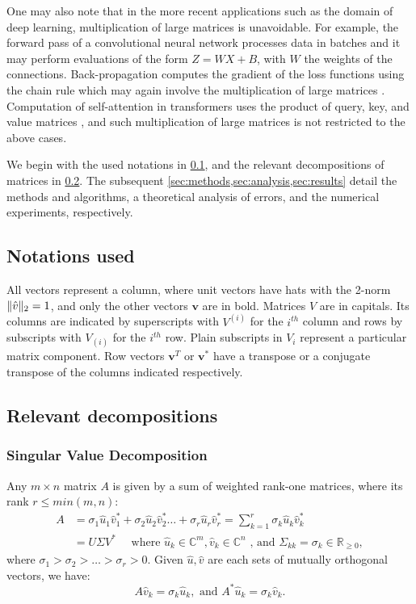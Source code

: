 \documentclass[onefignum,onetabnum]{siamart171218}
\DeclarePairedDelimiter\norm{\lVert}{\rVert}
\begin{document}
One may also note that in the more recent applications such as the domain of deep learning, multiplication of large matrices is unavoidable. For example, the forward pass of a convolutional neural network processes data in batches and it may perform evaluations of the form $Z = WX + B$, with $W$ the weights of the connections. Back-propagation computes the gradient of the loss functions using the chain rule which may again involve the multiplication of large matrices \cite{ciresan2011flexible,chellapilla2006high}. Computation of self-attention in transformers uses the product of query, key, and value matrices \cite{vaswani2017attention}, and such multiplication of large matrices is not restricted to the above cases.

We begin with the used notations in \cref{sec:notations}, and the relevant decompositions of matrices in \cref{sec:Decompositions}. The subsequent \cref{sec:methods,sec:analysis,sec:results} detail the methods and algorithms, a theoretical analysis of errors, and the numerical experiments, respectively.

\subsection{Notations used}\label{sec:notations}
All vectors represent a column, where unit vectors have hats with the 2-norm $\norm{\hat{v}}_2=1$, and only the other vectors $\bm v$ are in bold. Matrices $V$ are in capitals. Its columns are indicated by superscripts with $V^{(i)}$ for the $i^{th}$ column and rows by subscripts with $V_{(i)}$ for the $i^{th}$ row. Plain subscripts in $V_i$ represent a particular matrix component. Row vectors $\bm v^T$ or $\bm v^*$ have a transpose or a conjugate transpose of the columns indicated respectively.

\subsection{Relevant decompositions}\label{sec:Decompositions}

\subsubsection{Singular Value Decomposition}
Any $m \times n$ matrix $A$ is given by a sum of weighted rank-one matrices, where its rank $r \leq min(m,n)$:
\begin{align*}
    A &= \sigma_1 \hat{u}_1 \hat{v}_1^* + \sigma_2 \hat{u}_2 \hat{v}_2^* \dots + \sigma_{r} \hat{u}_{r} \hat{v}_{r}^* = \sum_{k = 1}^{r} \sigma_k \hat{u}_k \hat{v}_k^* \\
    &= U \Sigma V^*  \quad \text{ where } \hat{u}_k \in \mathbb{C}^m, \hat{v}_k \in \mathbb{C}^n \text{ , and } \Sigma_{kk} = \sigma_k \in \mathbb{R}_{\geq 0},
\end{align*}
where $\sigma_1 > \sigma_2 > \dots > \sigma_r > 0$. Given $\hat{u}, \hat{v}$ are each sets of mutually orthogonal vectors, we have:
\begin{equation*}
  A\hat{v}_k = \sigma_k \hat{u}_k, \text{ and } A^*\hat{u}_k = \sigma_k \hat{v}_k.  
\end{equation*}   
\end{document}
